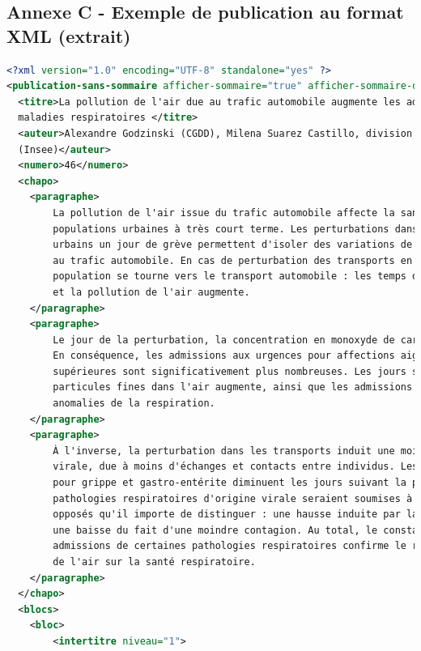 \subsection*{Annexe C - Exemple de publication au format XML (extrait)}
\begin{lstlisting}[language=XML, basicstyle=\small]
<?xml version="1.0" encoding="UTF-8" standalone="yes" ?> 
<publication-sans-sommaire afficher-sommaire="true" afficher-sommaire-documentation="false">
  <titre>La pollution de l'air due au trafic automobile augmente les admissions aux urgences pour 
  maladies respiratoires </titre> 
  <auteur>Alexandre Godzinski (CGDD), Milena Suarez Castillo, division Marchés et entreprises 
  (Insee)</auteur> 
  <numero>46</numero> 
  <chapo>
    <paragraphe>
        La pollution de l'air issue du trafic automobile affecte la santé respiratoire des 
        populations urbaines à très court terme. Les perturbations dans les transports en commun 
        urbains un jour de grève permettent d'isoler des variations de pollution de l'air attribuables
        au trafic automobile. En cas de perturbation des transports en commun, une partie de la 
        population se tourne vers le transport automobile : les temps de parcours sont alors plus longs, 
        et la pollution de l'air augmente.
    </paragraphe> 
    <paragraphe>
        Le jour de la perturbation, la concentration en monoxyde de carbone est plus élevée.
        En conséquence, les admissions aux urgences pour affections aigues des voies respiratoires 
        supérieures sont significativement plus nombreuses. Les jours suivants, la concentration en 
        particules fines dans l'air augmente, ainsi que les admissions aux urgences pour 
        anomalies de la respiration.
    </paragraphe> 
    <paragraphe>
        À l'inverse, la perturbation dans les transports induit une moindre propagation
        virale, due à moins d'échanges et contacts entre individus. Les admissions aux urgences 
        pour grippe et gastro-entérite diminuent les jours suivant la perturbation. Ainsi, les 
        pathologies respiratoires d'origine virale seraient soumises à deux phénomènes aux effets 
        opposés qu'il importe de distinguer : une hausse induite par la pollution de l'air accrue, 
        une baisse du fait d'une moindre contagion. Au total, le constat d'une hausse des 
        admissions de certaines pathologies respiratoires confirme le rôle néfaste de la pollution
        de l'air sur la santé respiratoire.
    </paragraphe> 
  </chapo>
  <blocs>
    <bloc>
        <intertitre niveau="1">

\end{lstlisting}
